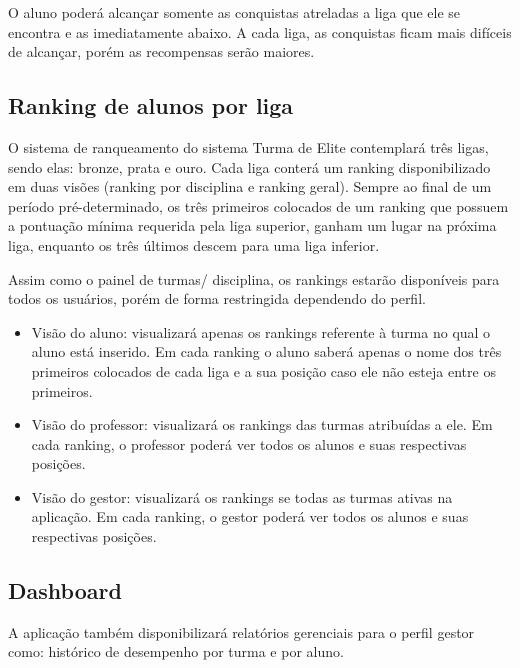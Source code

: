 O aluno poderá alcançar somente as conquistas atreladas a liga que ele se encontra e as imediatamente abaixo. A cada liga, as conquistas ficam mais difíceis de alcançar, porém as recompensas serão maiores. 
\subsection{Ranking de alunos por liga}
O sistema de ranqueamento do sistema Turma de Elite contemplará três ligas, sendo elas: bronze, prata e ouro. Cada liga conterá um ranking disponibilizado em duas visões (ranking por disciplina e ranking geral). Sempre ao final de um período pré-determinado, os três primeiros colocados de um ranking que possuem a pontuação mínima requerida pela liga superior, ganham um lugar na próxima liga, enquanto os três últimos descem para uma liga inferior.

Assim como o painel de turmas/ disciplina, os rankings estarão disponíveis para todos os usuários, porém de forma restringida dependendo do perfil.
\begin{itemize}
\item Visão do aluno: visualizará apenas os rankings referente à turma no qual o aluno está inserido. Em cada ranking o aluno saberá apenas o nome dos três primeiros colocados de cada liga e a sua posição caso ele não esteja entre os primeiros.
\item Visão do professor: visualizará os rankings das turmas atribuídas a ele. Em cada ranking, o professor poderá ver todos os alunos e suas respectivas posições.
\item Visão do gestor: visualizará os rankings se todas as turmas ativas na aplicação. Em cada ranking, o gestor poderá ver todos os alunos e suas respectivas posições.
\end{itemize}

\subsection{Dashboard}
A aplicação também disponibilizará relatórios gerenciais para o perfil gestor como: histórico de desempenho por turma e por aluno.
